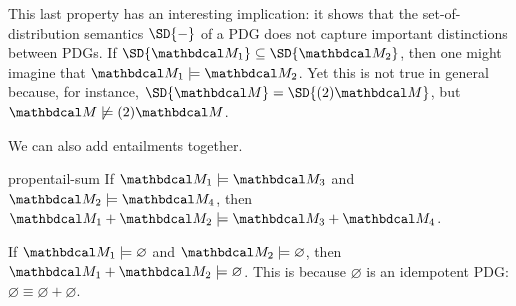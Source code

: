 This last property has an interesting implication: it shows that the set-of-distribution semantics $\SD{-}$ of a PDG does not capture important distinctions between PDGs. 
If $\SD{\dg M_1} \subseteq \SD{\dg M_2}$, then one might imagine that
$\dg M_1 \models \dg M_2$.
Yet this is not true in general
    because, for instance,
    $\SD{\dg M} = \SD{(2) \dg M}$, but $\dg M \not\models (2) \dg M$.



We can also add entailments together.

\begin{linked}{prop}{entail-sum}
    If $\dg M_1 \models \dg M_3$ and $\dg M_2 \models \dg M_4$, then
    $\dg M_1 + \dg M_2 \models \dg M_3 + \dg M_4$.
\end{linked}




\begin{coro}
    If $\dg M_1 \models \varnothing$ and $\dg M_2 \models \varnothing$, then $\dg M_1 + \dg M_2 \models \varnothing$. 
    This is because $\varnothing$ is an idempotent PDG:
    $\varnothing \equiv \varnothing + \varnothing$. 
\end{coro}

